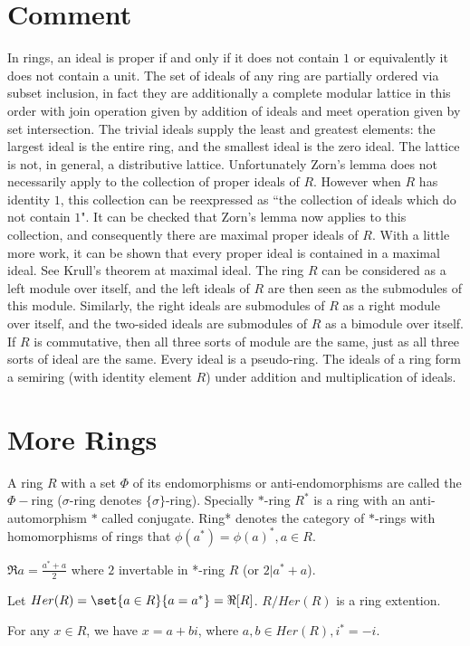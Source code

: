 \documentclass[11pt,a4paper,fleqn]{article}
\begin{document}
\section{Comment}
In rings, an ideal is proper if and only if it does not contain $1$ or equivalently it does not contain a unit.
The set of ideals of any ring are partially ordered via subset inclusion, in fact they are additionally a complete modular lattice in this order with join operation given by addition of ideals and meet operation given by set intersection. The trivial ideals supply the least and greatest elements: the largest ideal is the entire ring, and the smallest ideal is the zero ideal. The lattice is not, in general, a distributive lattice.
Unfortunately Zorn's lemma does not necessarily apply to the collection of proper ideals of $R$. However when $R$ has identity $1$, this collection can be reexpressed as ``the collection of ideals which do not contain $1$". It can be checked that Zorn's lemma now applies to this collection, and consequently there are maximal proper ideals of $R$. With a little more work, it can be shown that every proper ideal is contained in a maximal ideal. See Krull's theorem at maximal ideal.
The ring $R$ can be considered as a left module over itself, and the left ideals of $R$ are then seen as the submodules of this module. Similarly, the right ideals are submodules of $R$ as a right module over itself, and the two-sided ideals are submodules of $R$ as a bimodule over itself. If $R$ is commutative, then all three sorts of module are the same, just as all three sorts of ideal are the same.
Every ideal is a pseudo-ring.
The ideals of a ring form a semiring (with identity element $R$) under addition and multiplication of ideals.


\section{More Rings}
\begin{definition}
  A ring $R$ with a set $\Phi$ of its endomorphisms or anti-endomorphisms are called the $\Phi-$ring ($\sigma$-ring denotes $\{\sigma\}$-ring). Specially $*$-ring $R^*$ is a ring with an anti-automorphism $*$ called conjugate. Ring* denotes the category of $*$-rings with homomorphisms of rings that $\phi(a^*)=\phi(a)^*, a\in R$.
\end{definition}

\begin{definition}
  $\Re a = \frac{a^*+a}{2}$ where $2$ invertable in *-ring $R$ (or $2|a^*+a$).
\end{definition}

Let $Her(R)=\set{a\in R}{a=a^*}=\Re[R]$. $R/Her(R)$ is a ring extention.

\begin{fact}
   For any $x\in R$, we have $x=a+bi$, where $a,b\in Her(R),i^*=-i$.
\end{fact}

\end{document}
